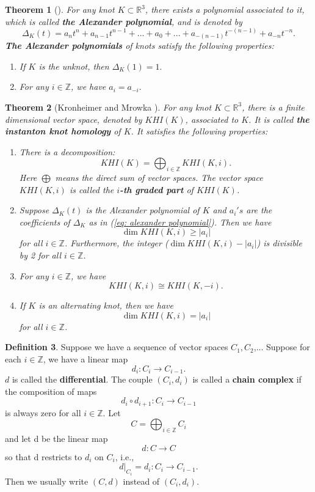 \documentclass{amsart}
\newtheorem{thm}{Theorem}[section]
\theoremstyle{definition}
\newtheorem{defn}[thm]{Definition}
\begin{document}
\begin{thm}[{\cite[Chapter 7 and 8]{rolfsen2003knot}}]\label{thm: KM}
For any knot $K\subset \mathbb{R}^3$, there exists a polynomial associated to it, which is called {\bf the Alexander polynomial}, and is denoted by
\begin{equation}\label{eq: alexander polynomial}
	\Delta_K(t)=a_{n}t^{n}+a_{n-1}t^{n-1}+...+a_{0}+...+a_{-(n-1)}t^{-(n-1)}+a_{-n}t^{-n}.
\end{equation}
{\bf The Alexander polynomials} of knots satisfy the following properties:
\begin{enumerate}
\item If $K$ is the unknot, then $\Delta_K(1)=1.$
\item
For any $i\in\mathbb{Z}$, we have $a_{i}=a_{-i}.$
\end{enumerate}
\end{thm}

\begin{thm}[Kronheimer and Mrowka \cite{kronheimer2010knots}]\label{thm: KM}
For any knot $K \subset\mathbb{R}^3$, there is a finite dimensional vector space, denoted by $KHI(K)$, associated to $K$. It is called {\bf the instanton knot homology} of $K$. It satisfies the following properties:
\begin{enumerate}
\item
There is a decomposition:
\[KHI(K)=\bigoplus_{i\in\mathbb{Z}} KHI(K,i).\]
Here $\bigoplus$ means the direct sum of vector spaces. The vector space $KHI(K,i)$ is called the {\bf $i$-th graded part} of $KHI(K)$.
\item
Suppose $\Delta_K(t)$ is the Alexander polynomial of $K$ and $a_{i}'s$ are the coefficients of $\Delta_K$ as in (\ref{eq: alexander polynomial}). Then we have
\[\dim KHI(K,i)\geq |a_{i}|\]
for all $i\in\mathbb{Z}$. Furthermore, the integer ($\dim KHI(K,i)-|a_{i}|$) is divisible by 2 for all $i\in\mathbb{Z}$.
\item For any $i\in\mathbb{Z}$, we have
\[KHI(K,i)\cong KHI(K,-i).\]
\item
If $K$ is an alternating knot, then we have
\[\dim KHI(K,i)=|a_{i}|\]
for all $i\in\mathbb{Z}$.
\end{enumerate}
\end{thm}

\begin{defn}
Suppose we have a sequence of vector spaces $C_{1},C_{2}$,... Suppose for each $i\in\mathbb{Z}$, we have a linear map
\[d_{i}:C_{i}\rightarrow C_{i-1}.\]
$d$ is called the {\bf differential}. The couple $({C_{i},{d_{i}}})$ is called a {\bf chain complex} if the composition of maps
\[d_{i}\circ d_{i+1}:C_{i}\rightarrow C_{i-1}\]
is always zero for all $i\in\mathbb{Z}$. Let
\[C=\bigoplus_{i\in\mathbb{Z}} C_{i}\]
and let d be the linear map
\[d:C\rightarrow C\]
so that d restricts to $d_{i}$ on $C_{i}$, i.e.,
\[d|_{C_{i}}=d_{i}:C_{i}\rightarrow C_{i-1}.\]
Then we usually write $(C,d)$ instead of $({C_{i}},{d_{i}})$.
\end{defn}
\end{document}
